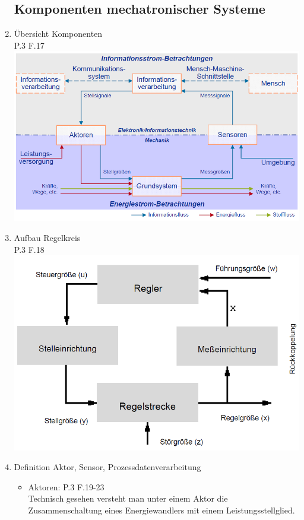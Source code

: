\documentclass[10pt,a4paper,fleqn]{article}
\begin{document}
\begin{enumerate}
\subsection{Komponenten mechatronischer Systeme}
	\item Übersicht Komponenten\\
		P.3 F.17
		\includegraphics[scale=0.4]{komponenten.png}
	\item Aufbau Regelkreis\\
		P.3 F.18\\
		\includegraphics[scale=0.5]{regelkreis.PNG}
	\item Definition Aktor, Sensor, Prozessdatenverarbeitung
		\begin{itemize}
		 	\item Aktoren: P.3 F.19-23\\
		 		Technisch gesehen versteht man unter einem Aktor die Zusammenschaltung eines Energiewandlers mit einem Leistungsstellglied.\\

\end{itemize}
\end{enumerate}
\end{document}
